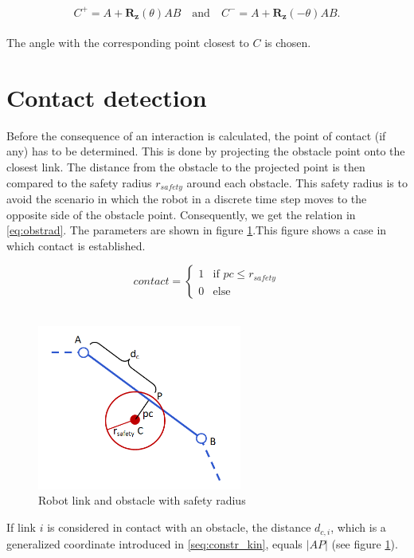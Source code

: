 \begin{equation}
    C^+ = A + \mathbf{R_z}(\theta)AB \quad \text{and} \quad
    C^- = A + \mathbf{R_z}(-\theta)AB.
\end{equation}
\\
The angle with the corresponding point closest to $C$ is chosen.



\section{Contact detection}

Before the consequence of an interaction is calculated, the point of contact (if any) has to be determined. This is done by projecting the obstacle point onto the closest link. The distance from the obstacle to the projected point is then compared to the safety radius $r_{safety}$ around each obstacle. This safety radius is to avoid the scenario in which the robot in a discrete time step moves to the opposite side of the obstacle point. Consequently, we get the relation in \ref{eq:obstrad}. The parameters are shown in figure \ref{fig:obstrad}.This figure shows a case in which contact is established.

\begin{equation}\label{eq:obstrad}
    contact =
    \begin{cases}
        1 & \text{if $pc \leq r_{safety}$}\\
        0 & \text{else}
    \end{cases}
\end{equation}
\\
\begin{figure}
    \centering
    \includegraphics[width=0.6\textwidth]{figures/obst_radius.PNG}
    \caption{Robot link and obstacle with safety radius}
    \label{fig:obstrad}
\end{figure}
If link $i$ is considered in contact with an obstacle, the distance $d_{c,i}$, which is a generalized coordinate introduced in \ref{seq:constr_kin}, equals $|AP|$ (see figure \ref{fig:obstrad}).


